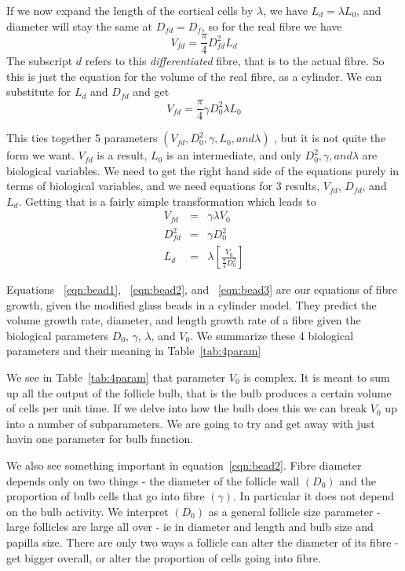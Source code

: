 \documentclass[titlepage]{article}  %
\begin{document}
If we now expand the length of the cortical cells by $\lambda$, we have $L_{d} = \lambda L_{0}$, and diameter will stay the same at $D_{fd} = D_{f}$, so for the real fibre we have 
\begin{displaymath}
V_{fd} =  \frac{\pi}{4} D_{fd}^{2} L_{d}
\end{displaymath}
 The subscript $d$ refers to this {\em differentiated} fibre, that is to the actual fibre. So this is just the equation for the volume of the real fibre, as a cylinder. We can substitute for $L_{d}$ and $D_{fd}$ and get
\begin{displaymath}
V_{fd} =  \frac{\pi}{4} \gamma D_{0}^{2} \lambda L_{0} 
\end{displaymath}

This ties together 5 parameters $(V_{fd}, D_{0}^{2}, \gamma, L_{0}, and \lambda)$ , but it is not quite the form we want. $V_{fd}$ is a result, $L_{0}$ is an intermediate, and only $D_{0}^{2}, \gamma, and \lambda$ are biological variables. We need to get the right hand side of the equations  purely in terms of biological variables, and we need equations for 3 results, $V_{fd}$, $D_{fd}$, and $L_{d}$. Getting that is a fairly simple transformation which leads to
\begin{eqnarray}
\label{eqn:bead1}
V_{fd}  & = & \gamma \lambda V_{0} \\
\label{eqn:bead2}
D_{fd}^{2} & = & \gamma D_{0}^{2} \\
\label{eqn:bead3}
L_{d}  & = & \lambda \left [ \frac{V_{0}}{\frac{\pi}{4} D_{0}^{2}} \right ]
\end{eqnarray}

Equations ~\ref{eqn:bead1}, ~\ref{eqn:bead2}, and ~\ref{eqn:bead3} are our equations of fibre growth, given the modified  glass beads in a cylinder model. They predict the volume growth rate, diameter, and length growth rate of a fibre given the biological parameters $D_{0}$, $\gamma$, $\lambda$, and $V_{0}$. We summarize these 4 biological parameters and their meaning in Table~\ref{tab:4param}

We see in Table~\ref{tab:4param} that parameter $V_{0}$ is complex. It is meant to sum up all the output of the follicle bulb, that is the bulb produces a certain volume of cells per unit time. If we delve into how the bulb does this we can break $V_{0}$ up into a number of subparameters. We are going to try and get away with just havin one parameter for bulb function.

We also see something important in equation~\ref{eqn:bead2}. Fibre diameter depends only on two things - the diameter of the follicle wall $(D_{0})$ and the proportion of bulb cells that go into fibre $(\gamma)$. In particular it does not depend on the bulb activity. We interpret $(D_{0})$ as a general follicle size parameter - large follicles are large all over - ie in diameter and length and bulb size and papilla size. There are only two ways a follicle can alter the diameter of its fibre - get bigger overall, or alter the proportion of cells going into fibre. 
\end{document}
